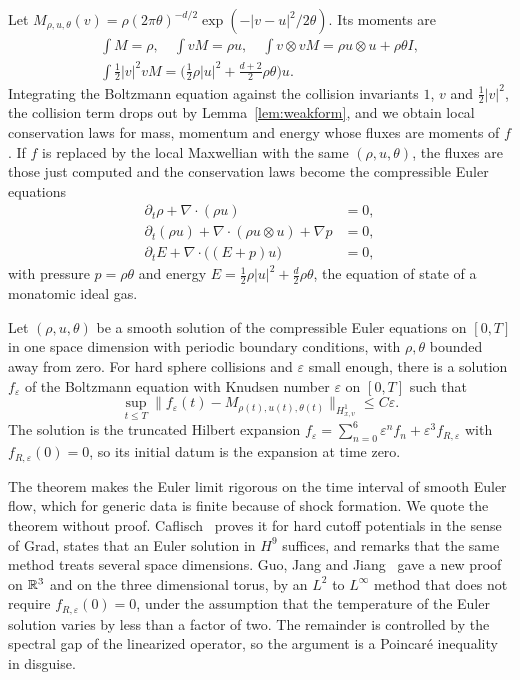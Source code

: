 Let $M_{\rho,u,\theta}(v) = \rho(2\pi\theta)^{-d/2}\exp(-|v-u|^2/2\theta)$. Its moments are
\begin{gather*}
\int M = \rho,\quad\int vM = \rho u,\quad\int v\otimes vM = \rho u\otimes u+\rho\theta I,\\ \int\tfrac12|v|^2vM = \Big(\tfrac12\rho|u|^2+\tfrac{d+2}{2}\rho\theta\Big)u.
\end{gather*}
Integrating the Boltzmann equation against the collision invariants $1$, $v$ and $\frac12|v|^2$, the collision term drops out by Lemma~\ref{lem:weakform}, and we obtain local conservation laws for mass, momentum and energy whose fluxes are moments of $f$. If $f$ is replaced by the local Maxwellian with the same $(\rho,u,\theta)$, the fluxes are those just computed and the conservation laws become the compressible Euler equations
\begin{align*}
\partial_t\rho+\nabla\cdot(\rho u) &= 0,\\
\partial_t(\rho u)+\nabla\cdot(\rho u\otimes u)+\nabla p &= 0,\\
\partial_tE+\nabla\cdot\big((E+p)u\big) &= 0,
\end{align*}
with pressure $p = \rho\theta$ and energy $E = \frac12\rho|u|^2+\frac d2\rho\theta$, the equation of state of a monatomic ideal gas. \begin{theorem}[Caflisch]
\label{thm:caflisch}
Let $(\rho,u,\theta)$ be a smooth solution of the compressible Euler equations on $[0,T]$ in one space dimension with periodic boundary conditions, with $\rho,\theta$ bounded away from zero. For hard sphere collisions and $\varepsilon$ small enough, there is a solution $f_\varepsilon$ of the Boltzmann equation with Knudsen number $\varepsilon$ on $[0,T]$ such that
\[
\sup_{t\leq T}\big\|f_\varepsilon(t)-M_{\rho(t),u(t),\theta(t)}\big\|_{H^1_{x,v}}\leq C\varepsilon.
\]
The solution is the truncated Hilbert expansion $f_\varepsilon = \sum_{n=0}^6\varepsilon^nf_n+\varepsilon^3f_{R,\varepsilon}$ with $f_{R,\varepsilon}(0) = 0$, so its initial datum is the expansion at time zero.
\end{theorem}

The theorem makes the Euler limit rigorous on the time interval of smooth Euler flow, which for generic data is finite because of shock formation. We quote the theorem without proof. Caflisch~\cite{caflisch1980} proves it for hard cutoff potentials in the sense of Grad, states that an Euler solution in $H^9$ suffices, and remarks that the same method treats several space dimensions. Guo, Jang and Jiang~\cite{guojangjiang2009} gave a new proof on $\mathbb{R}^3$ and on the three dimensional torus, by an $L^2$ to $L^\infty$ method that does not require $f_{R,\varepsilon}(0) = 0$, under the assumption that the temperature of the Euler solution varies by less than a factor of two. The remainder is controlled by the spectral gap of the linearized operator, so the argument is a Poincar\'e inequality in disguise.


